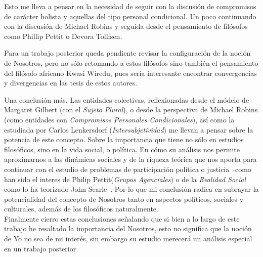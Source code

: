 \documentclass[oneside]{book}
\begin{document}
Esto me lleva a pensar en la necesidad de seguir con la discusión de compromisos de carácter holista y aquellas del tipo personal condicional. Un poco continuando con la discusión de Michael Robins y seguida desde el pensamiento de fílósofos como Phillip Pettit\cite{pettit} o Devora Tollfsen\cite{Dev}. 

Para un trabajo posterior queda pendiente revisar la configuración de la noción de Nosotros, pero no sólo retomando a estos filósofos sino también el pensamiento del filósofo africano Kwasi Wiredu, pues sería interesante encontrar convergencias y divergencias en las tesis de estos autores. 

Una conclusión más. Las entidades colectivas, reflexionadas desde el módelo de Margaret Gilbert (con el \textit{Sujeto Plural}), o desde la perspectiva de Michael Robins (como entidades con \textit{Compromisos Personales Condicionales}), así como la estudiada por Carlos Lenkersdorf (\textit{Intersubjetividad}) me llevan a pensar sobre la potencia de este concepto. Sobre la importancia que tiene no sólo en estudios filosóficos, sino en la vida social, o política. En cómo su análisis nos permite aproximarnos a las dinámicas sociales y de la riqueza teórica que nos aporta para continuar con el estudio de problemas de participación política o justicia --como han sido el interes de Philip Pettit(\textit{Grupos Agenciales}) o de la \textit{Realidad Social} como lo ha teorizado John Searle--. Por lo que mi conclusión radica en subrayar la potencialidad del concepto de Nosotros tanto en aspectos políticos, sociales y culturales, además de los filosóficos naturalmente.
\\


Finalmente cierro estas conclusiones señalando que si bien a lo largo de este trabajo he resaltado la importancia del Nosotros, esto no significa que la noción de Yo no sea de mi interés, sin embargo su estudio merecerá un análisis especial en un trabajo posterior.
\end{document}
